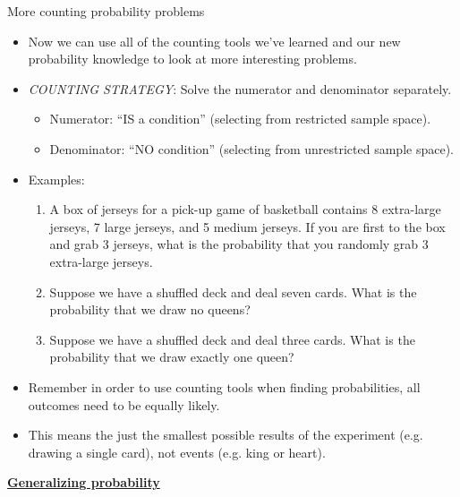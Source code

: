 \documentclass{article}
\newcommand{\bu}[1]{\textbf{\ul{#1}}}			%
\begin{document}
More counting probability problems\bigskip
\begin{itemize}
    \item Now we can use all of the counting tools we've learned and our new probability knowledge to look at more interesting problems.
    \item \textit{COUNTING STRATEGY}: Solve the numerator and denominator separately.
    \begin{itemize}
        \item Numerator: ``IS a condition'' (selecting from restricted sample space).
        \item Denominator: ``NO condition'' (selecting from unrestricted sample space).
    \end{itemize}
    \item Examples:
    \begin{enumerate}
        \item A box of jerseys for a pick-up game of basketball contains 8 extra-large jerseys, 7 large jerseys, and 5 medium jerseys. If you are first to the box and grab 3 jerseys, what is the probability that you randomly grab 3 extra-large jerseys.
\vspace{150pt}
        \item Suppose we have a shuffled deck and deal seven cards. What is the probability that we draw no queens?\vspace{100pt}
        \item Suppose we have a shuffled deck and deal three cards. What is the probability that we draw exactly one queen?\vspace{150pt}
    \end{enumerate}
    \item Remember in order to use counting tools when finding probabilities, all outcomes need to be equally likely.
    \item[] This means the just the smallest possible results of the experiment (e.g. drawing a single card), not events (e.g. king or heart).
\end{itemize}\bigskip

\bu{Generalizing probability}\bigskip
\end{document}
